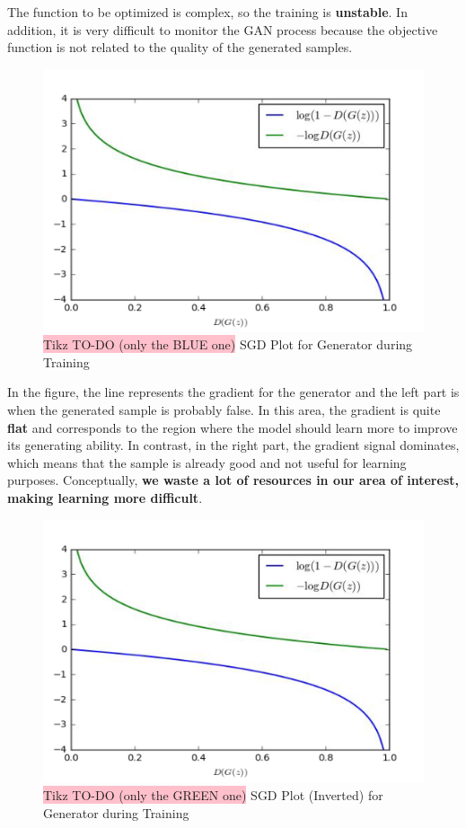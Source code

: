 The function to be optimized is complex, so the training is \textbf{unstable}. In addition, it is very difficult to monitor the GAN process because the objective function is not related to the quality of the generated samples.

\begin{figure}[!htbp]
    \centering
    \includegraphics[width=0.7\linewidth]{tikz/chapter9 - SGD GAN Plot 1.png}
    \caption{{\color{red}\colorbox{pink}{Tikz TO-DO (only the BLUE one)}} SGD Plot for Generator during Training}
\end{figure}

In the figure, the line represents the gradient for the generator and the left part is when the generated sample is probably false. In this area, the gradient is quite \textbf{flat} and corresponds to the region where the model should learn more to improve its generating ability. In contrast, in the right part, the gradient signal dominates, which means that the sample is already good and not useful for learning purposes. Conceptually, \textbf{we waste a lot of resources in our area of interest, making learning more difficult}.

\begin{figure}[!htbp]
    \centering
    \includegraphics[width=0.7\linewidth]{tikz/chapter9 - SGD GAN Plot 1.png}
    \caption{{\color{red}\colorbox{pink}{Tikz TO-DO (only the GREEN one)}} SGD Plot (Inverted) for Generator during Training}
\end{figure}


